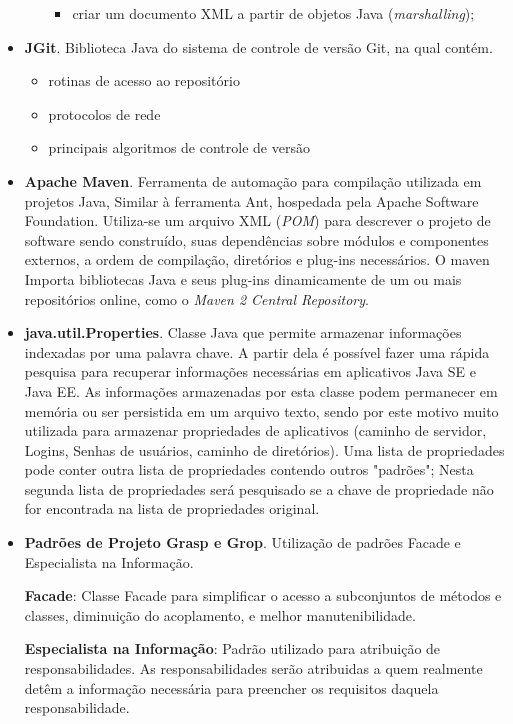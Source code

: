 \begin{itemize}
\begin{itemize}
\begin{itemize}
        \item criar um documento XML a partir de objetos Java (\textit{marshalling});
        
        \end{itemize} 
    \end{itemize}
    

\item \textbf{JGit}. Biblioteca Java do sistema de controle de versão Git, na qual contém.
    \begin{itemize}
    \item rotinas de acesso ao repositório
    
    \item protocolos de rede
    
    \item principais algoritmos de controle de versão
    \end{itemize}

\item \textbf{Apache Maven}. Ferramenta de automação para compilação utilizada em projetos Java,  Similar à ferramenta Ant, hospedada pela Apache Software Foundation. Utiliza-se um arquivo XML (\textit{POM}) para descrever o projeto de software sendo construído, suas dependências sobre módulos e componentes externos, a ordem de compilação, diretórios e plug-ins necessários. O maven Importa bibliotecas Java e seus plug-ins dinamicamente de um ou mais repositórios online, como o \textit{Maven 2 Central Repository}.


\item \textbf{java.util.Properties}. Classe Java que permite armazenar informações indexadas por uma palavra chave. A partir dela é possível fazer uma rápida pesquisa para recuperar informações necessárias em aplicativos Java SE e Java EE. As informações armazenadas por esta classe podem permanecer em memória ou ser persistida em um arquivo texto, sendo por este motivo muito utilizada para armazenar propriedades de aplicativos (caminho de servidor, Logins, Senhas de usuários, caminho de diretórios).
	Uma lista de propriedades pode conter outra lista de propriedades contendo outros "padrões"; Nesta segunda lista de propriedades será pesquisado se a chave de propriedade não for encontrada na lista de propriedades original.




\item \textbf{Padrões de Projeto Grasp e Grop}. \cite{larman2004} Utilização de padrões Facade e Especialista na Informação.

\textbf{Facade}: Classe Facade para simplificar o acesso a subconjuntos de métodos e classes, diminuição do acoplamento, e melhor manutenibilidade.

\textbf{Especialista na Informação}: Padrão utilizado para atribuição de responsabilidades. As responsabilidades serão atribuidas a quem realmente detêm a informação necessária para preencher os requisitos daquela responsabilidade.

\end{itemize}